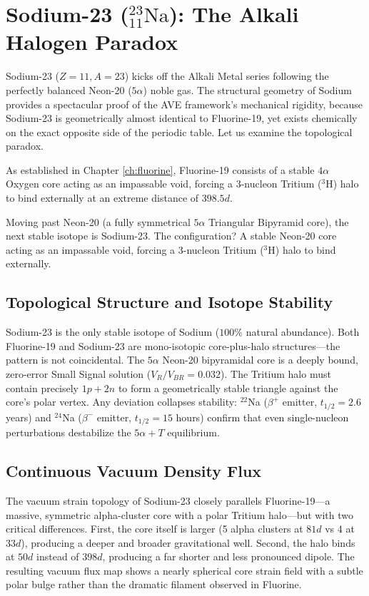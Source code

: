 \chapter{Sodium-23 ($^{23}_{11}\text{Na}$): The Alkali Halogen Paradox}
\label{ch:sodium}

Sodium-23 ($Z=11, A=23$) kicks off the Alkali Metal series following the perfectly balanced Neon-20 ($5\alpha$) noble gas. The structural geometry of Sodium provides a spectacular proof of the AVE framework's mechanical rigidity, because Sodium-23 is geometrically almost identical to Fluorine-19, yet exists chemically on the exact opposite side of the periodic table. Let us examine the topological paradox.

As established in Chapter \ref{ch:fluorine}, Fluorine-19 consists of a stable $4\alpha$ Oxygen core acting as an impassable void, forcing a 3-nucleon Tritium ($^3\text{H}$) halo to bind externally at an extreme distance of $398.5d$.

Moving past Neon-20 (a fully symmetrical $5\alpha$ Triangular Bipyramid core), the next stable isotope is Sodium-23. The configuration? A stable Neon-20 core acting as an impassable void, forcing a 3-nucleon Tritium ($^3\text{H}$) halo to bind externally.

\section{Topological Structure and Isotope Stability}
Sodium-23 is the only stable isotope of Sodium ($100\%$ natural abundance). Both Fluorine-19 and Sodium-23 are mono-isotopic core-plus-halo structures---the pattern is not coincidental. The $5\alpha$ Neon-20 bipyramidal core is a deeply bound, zero-error Small Signal solution ($V_R/V_{BR} = 0.032$). The Tritium halo must contain precisely $1p + 2n$ to form a geometrically stable triangle against the core's polar vertex. Any deviation collapses stability: $^{22}$Na ($\beta^+$ emitter, $t_{1/2} = 2.6$ years) and $^{24}$Na ($\beta^-$ emitter, $t_{1/2} = 15$ hours) confirm that even single-nucleon perturbations destabilize the $5\alpha + T$ equilibrium.

\section{Continuous Vacuum Density Flux}
The vacuum strain topology of Sodium-23 closely parallels Fluorine-19---a massive, symmetric alpha-cluster core with a polar Tritium halo---but with two critical differences. First, the core itself is larger (5 alpha clusters at $81d$ vs 4 at $33d$), producing a deeper and broader gravitational well. Second, the halo binds at $50d$ instead of $398d$, producing a far shorter and less pronounced dipole. The resulting vacuum flux map shows a nearly spherical core strain field with a subtle polar bulge rather than the dramatic filament observed in Fluorine.

